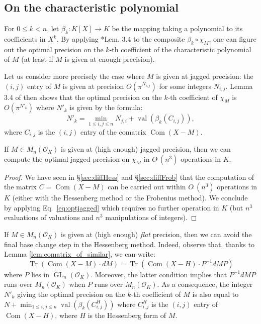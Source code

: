 \documentclass{sig-alternate-05-2015}
\DeclareMathOperator{\GL}{GL}
\DeclareMathOperator{\val}{val}
\DeclareMathOperator{\tr}{Tr}
\DeclareMathOperator{\com}{Com}
\newcommand{\OK}{\mathcal{O}_K}
\newcommand{\softO}{O\tilde{~}}
\begin{document}
\subsection{On the characteristic polynomial}

For $0 \leq k < n$, let $\beta_k : K[X] \to K$ be the mapping taking a 
polynomial to its coefficients in $X^k$. By applying 
\cite{caruso-roe-vaccon:14a}*{Lem. 3.4} to the composite $\beta_k 
\circ \chi_M$, one can figure out the optimal precision on the
$k$-th coefficient of the characteristic polynomial of $M$ (at
least if $M$ is given at enough precision).

Let us consider more precisely the case where $M$ is given at 
jagged precision: the $(i,j)$ entry of $M$ is given at precision 
$O(\pi^{N_{i,j}})$ for some integers $N_{i,j}$. 
Lemma 3.4 of \cite{caruso-roe-vaccon:14a} then shows that
the optimal precision on the $k$-th coefficient of $\chi_M$ is 
$O(\pi^{N'_k})$ where $N'_k$ is given by the formula:
\begin{equation}
\label{eq:optjagged}
N'_k = \min_{1 \leq i, j\leq n} N_{j,i} + \val(\beta_k(C_{i,j})),
\end{equation}
where $C_{i,j}$ is the $(i,j)$ entry of the comatrix $\com(X{-}M)$.

\begin{prop} \label{prop:optimal_jagged}
If $M \in M_n(\OK)$ is given at (high enough) jagged precision, 
then we can compute the optimal jagged precision on $\chi_M$ in 
$\softO (n^3)$ operations in $K$.
\end{prop}

\begin{proof}
We have seen in \S \ref{sec:diffHess} and \S \ref{sec:diffFrob}
that the computation of the matrix $C = \com(X{-}M)$ can be carried out 
within $\softO(n^3)$ operations in $K$ (either with the Hessenberg 
method or the Frobenius method). We conclude by applying 
Eq.~\eqref{eq:optjagged} which requires no further operation in $K$
(but $n^3$ evaluations of valuations and $n^3$ manipulations of 
integers).
\end{proof}

\begin{rem}
If $M \in M_n(\OK)$ is given at (high enough) \emph{flat} precision, 
then we can avoid the final base change step in the Hessenberg method.
Indeed, observe that, thanks to Lemma \ref{lem:comatrix_of_similar}, 
we can write:
$$\tr(\com (X{-}M) \cdot dM)=\tr(\com (X{-}H)\cdot P^{-1} dM P)$$
where $P$ lies in $\GL_n(\OK)$. Moreover, the latter condition implies
that $P^{-1} dM P$ runs over $M_n(\OK)$ when $P$ runs over $M_n(\OK)$.
As a consequence, the integer $N'_k$ giving the optimal precision on the 
$k$-th coefficient of $M$ is also equal to
$N + \min_{1 \leq i, j\leq n} \val(\beta_k(C^H_{i,j}))$
where $C^H_{i,j}$ is the $(i,j)$ entry of $\com(X{-}H)$,
where $H$ is the Hessenberg form of $M$.
\end{rem}
\end{document}
